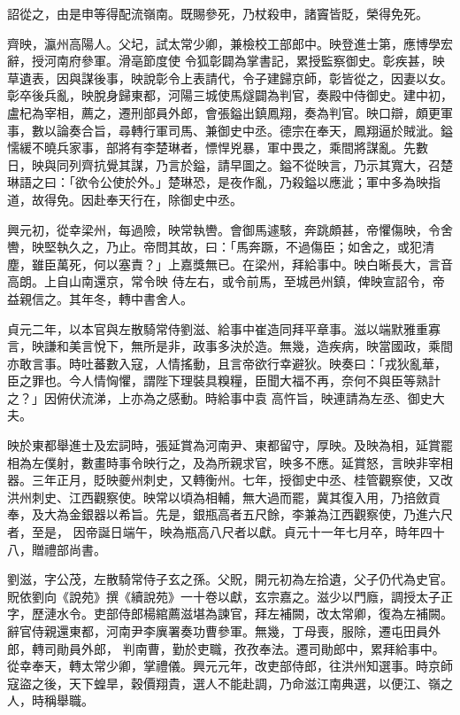 \begin{pinyinscope}
 詔從之，由是申等得配流嶺南。既賜參死，乃杖殺申，諸竇皆貶，榮得免死。



 齊映，瀛州高陽人。父圮，試太常少卿，兼檢校工部郎中。映登進士第，應博學宏辭，授河南府參軍。滑亳節度使
 令狐彰闢為掌書記，累授監察御史。彰疾甚，映草遺表，因與謀後事，映說彰令上表請代，令子建歸京師，彰皆從之，因妻以女。彰卒後兵亂，映脫身歸東都，河陽三城使馬燧闢為判官，奏殿中侍御史。建中初，盧杞為宰相，薦之，遷刑部員外郎，會張鎰出鎮鳳翔，奏為判官。映口辯，頗更軍事，數以論奏合旨，尋轉行軍司馬、兼御史中丞。德宗在奉天，鳳翔逼於賊泚。鎰懦緩不曉兵家事，部將有李楚琳者，慓悍兇暴，軍中畏之，乘間將謀亂。先數
 日，映與同列齊抗覺其謀，乃言於鎰，請早圖之。鎰不從映言，乃示其寬大，召楚琳語之曰：「欲令公使於外。」楚琳恐，是夜作亂，乃殺鎰以應泚；軍中多為映指道，故得免。因赴奉天行在，除御史中丞。



 興元初，從幸梁州，每過險，映常執轡。會御馬遽駭，奔跳頗甚，帝懼傷映，令舍轡，映堅執久之，乃止。帝問其故，曰：「馬奔蹶，不過傷臣；如舍之，或犯清塵，雖臣萬死，何以塞責？」上嘉獎無已。在梁州，拜給事中。映白晰長大，言音高朗。上自山南還京，常令映
 侍左右，或令前馬，至城邑州鎮，俾映宣詔令，帝益親信之。其年冬，轉中書舍人。



 貞元二年，以本官與左散騎常侍劉滋、給事中崔造同拜平章事。滋以端默雅重寡言，映謙和美言悅下，無所是非，政事多決於造。無幾，造疾病，映當國政，乘間亦敢言事。時吐蕃數入寇，人情搖動，且言帝欲行幸避狄。映奏曰：「戎狄亂華，臣之罪也。今人情恟懼，謂陛下理裝具糗糧，臣聞大福不再，奈何不與臣等熟計之？」因俯伏流涕，上亦為之感動。時給事中袁
 高忤旨，映連請為左丞、御史大夫。



 映於東都舉進士及宏詞時，張延賞為河南尹、東都留守，厚映。及映為相，延賞罷相為左僕射，數畫時事令映行之，及為所親求官，映多不應。延賞怒，言映非宰相器。三年正月，貶映夔州刺史，又轉衡州。七年，授御史中丞、桂管觀察使，又改洪州刺史、江西觀察使。映常以頃為相輔，無大過而罷，冀其復入用，乃掊斂貢奉，及大為金銀器以希旨。先是，銀瓶高者五尺餘，李兼為江西觀察使，乃進六尺者，至是，
 因帝誕日端午，映為瓶高八尺者以獻。貞元十一年七月卒，時年四十八，贈禮部尚書。



 劉滋，字公茂，左散騎常侍子玄之孫。父貺，開元初為左拾遺，父子仍代為史官。貺依劉向《說苑》撰《續說苑》一十卷以獻，玄宗嘉之。滋少以門廕，調授太子正字，歷漣水令。吏部侍郎楊綰薦滋堪為諫官，拜左補闕，改太常卿，復為左補闕。辭官侍親還東都，河南尹李廙署奏功曹參軍。無幾，丁母喪，服除，遷屯田員外郎，轉司勛員外郎，
 判南曹，勤於吏職，孜孜奉法。遷司勛郎中，累拜給事中。從幸奉天，轉太常少卿，掌禮儀。興元元年，改吏部侍郎，往洪州知選事。時京師寇盜之後，天下蝗旱，穀價翔貴，選人不能赴調，乃命滋江南典選，以便江、嶺之人，時稱舉職。




\end{pinyinscope}
